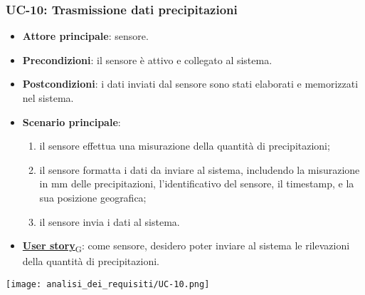 \subsubsection{UC-10: Trasmissione dati precipitazioni}
\begin{itemize}
	\item \textbf{Attore principale}: sensore.
	\item \textbf{Precondizioni}: il sensore è attivo e collegato al sistema.
	\item \textbf{Postcondizioni}: i dati inviati dal sensore sono stati elaborati e memorizzati nel sistema.
	\item \textbf{Scenario principale}:
	      \begin{enumerate}
		      \item il sensore effettua una misurazione della quantità di precipitazioni;
		      \item il sensore formatta i dati da inviare al sistema, includendo la misurazione in mm delle precipitazioni, l'identificativo del sensore,
		            il timestamp, e la sua posizione geografica;
		      \item il sensore invia i dati al sistema.
	      \end{enumerate}
	\item \href{https://7last.github.io/docs/pb/documentazione-interna/glossario\#user-story}{\textbf{User story}\textsubscript{G}}: come sensore, desidero poter inviare al sistema le rilevazioni della quantità di precipitazioni.
\end{itemize}

\begin{center}
	\texttt{[image: analisi\_dei\_requisiti/UC-10.png]}
\end{center}
